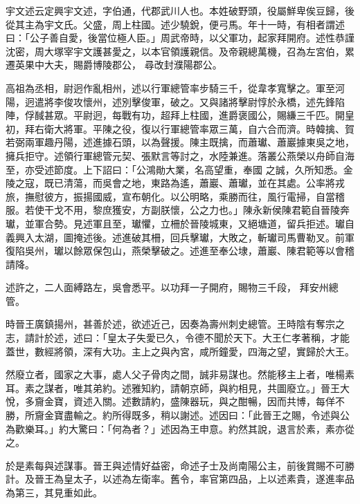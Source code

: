
\begin{pinyinscope}

 宇文述云定興宇文述，字伯通，代郡武川人也。本姓破野頭，役屬鮮卑俟豆歸，後從其主為宇文氏。父盛，周上柱國。述少驍銳，便弓馬。年十一時，有相者謂述曰：「公子善自愛，後當位極人臣。」周武帝時，以父軍功，起家拜開府。述性恭謹沈密，周大塚宰宇文護甚愛之，以本官領護親信。及帝親總萬機，召為左宮伯，累遷英果中大夫，賜爵博陵郡公，
 尋改封濮陽郡公。



 高祖為丞相，尉迥作亂相州，述以行軍總管率步騎三千，從韋孝寬擊之。軍至河陽，迥遣將李俊攻懷州，述別擊俊軍，破之。又與諸將擊尉惇於永橋，述先鋒陷陣，俘馘甚眾。平尉迥，每戰有功，超拜上柱國，進爵褒國公，賜縑三千匹。開皇初，拜右衛大將軍。平陳之役，復以行軍總管率眾三萬，自六合而濟。時韓擒、賀若弼兩軍趣丹陽，述進據石頭，以為聲援。陳主既擒，而蕭瓛、蕭巖據東吳之地，擁兵拒守。述領行軍總管元契、張默言等討之，水陸兼進。落叢公燕榮以舟師自海至，亦受述節度。上下詔曰：「公鴻勛大業，名高望重，奉國
 之誠，久所知悉。金陵之寇，既已清蕩，而吳會之地，東路為遙，蕭巖、蕭瓛，並在其處。公率將戎旅，撫慰彼方，振揚國威，宣布朝化。以公明略，乘勝而往，風行電掃，自當稽服。若使干戈不用，黎庶獲安，方副朕懷，公之力也。」陳永新侯陳君範自晉陵奔瓛，並軍合勢。見述軍且至，瓛懼，立柵於晉陵城東，又絕塘道，留兵拒述。瓛自義興入太湖，圖掩述後。述進破其柵，回兵擊瓛，大敗之，斬瓛司馬曹勒叉。前軍復陷吳州，瓛以餘眾保包山，燕榮擊破之。述進至奉公埭，蕭巖、陳君範等以會稽請降。



 述許之，二人面縛路左，吳會悉平。以功拜一子開府，賜物三千段，
 拜安州總管。



 時晉王廣鎮揚州，甚善於述，欲述近己，因奏為壽州刺史總管。王時陰有奪宗之志，請計於述，述曰：「皇太子失愛已久，令德不聞於天下。大王仁孝著稱，才能蓋世，數經將領，深有大功。主上之與內宮，咸所鐘愛，四海之望，實歸於大王。



 然廢立者，國家之大事，處人父子骨肉之間，誠非易謀也。然能移主上者，唯楊素耳。素之謀者，唯其弟約。述雅知約，請朝京師，與約相見，共圖廢立。」晉王大悅，多齎金寶，資述入關。述數請約，盛陳器玩，與之酣暢，因而共博，每佯不勝，所齎金寶盡輸之。約所得既多，稍以謝述。述因曰：「此晉王之賜，令述與公
 為歡樂耳。」約大驚曰：「何為者？」述因為王申意。約然其說，退言於素，素亦從之。



 於是素每與述謀事。晉王與述情好益密，命述子士及尚南陽公主，前後賞賜不可勝計。及晉王為皇太子，以述為左衛率。舊令，率官第四品，上以述素貴，遂進率品為第三，其見重如此。




\end{pinyinscope}
